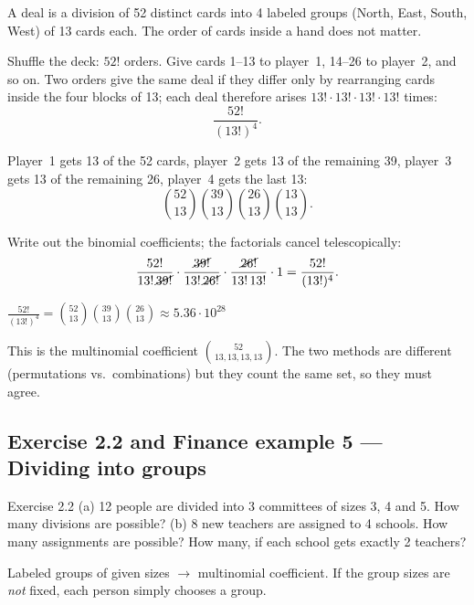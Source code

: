 \ifsolutions
	\soltitle
	\idea A deal is a division of 52 distinct cards into 4 labeled groups
	(North, East, South, West) of 13 cards each. The order of cards inside a
	hand does not matter.

	 Shuffle the deck: $52!$ orders. Give cards 1--13 to
	player~1, 14--26 to player~2, and so on. Two orders give the same deal if
	they differ only by rearranging cards inside the four blocks of 13; each
	deal therefore arises $13!\cdot13!\cdot13!\cdot13!$ times:
	\[ \frac{52!}{(13!)^4}. \]

	 Player~1 gets 13 of the 52 cards, player~2 gets 13
	of the remaining 39, player~3 gets 13 of the remaining 26, player~4 gets the
	last 13:
	\[ \binom{52}{13}\binom{39}{13}\binom{26}{13}\binom{13}{13}. \]

	 Write out the binomial coefficients; the factorials cancel
	telescopically:
	\[ \frac{52!}{13!\,\cancel{39!}}\cdot\frac{\cancel{39!}}{13!\,\cancel{26!}}
		\cdot\frac{\cancel{26!}}{13!\,13!}\cdot1=\frac{52!}{(13!)^4}. \]
	\begin{answer}
		$\displaystyle\frac{52!}{(13!)^4}=\binom{52}{13}\binom{39}{13}\binom{26}{13}
			\approx5.36\cdot10^{28}$
	\end{answer}
	\begin{remark}
		This is the multinomial coefficient $\binom{52}{13,13,13,13}$. The two
		methods are different (permutations vs.\ combinations) but they count the
		same set, so they must agree.
	\end{remark}
\fi

\subsection{Exercise 2.2 and Finance example 5 --- Dividing into groups}

\begin{task}{Exercise 2.2}
	(a) 12 people are divided into 3 committees of sizes 3, 4 and 5. How many
	divisions are possible?
	(b) 8 new teachers are assigned to 4 schools. How many assignments are
	possible? How many, if each school gets exactly 2 teachers?
\end{task}
\workspace{3cm}

\ifsolutions
	\soltitle
	\idea Labeled groups of given sizes $\to$ multinomial coefficient. If the
	group sizes are \emph{not} fixed, each person simply chooses a group.

